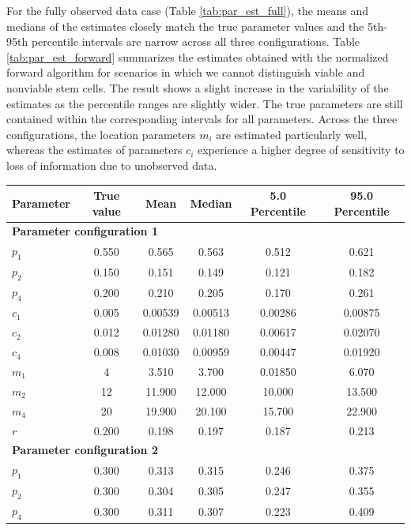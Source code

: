 \documentclass[pdflatex,sn-mathphys-num]{sn-jnl}
\theoremstyle{thmstyleone}%
\theoremstyle{thmstyletwo}%
\theoremstyle{thmstylethree}%
\begin{document}
For the fully observed data case (Table \ref{tab:par_est_full}), the means and medians of the estimates closely match the true parameter values and the 5th-95th percentile intervals are narrow across all three configurations. Table \ref{tab:par_est_forward} summarizes the estimates obtained with the normalized forward algorithm for scenarios in which we cannot distinguish viable and nonviable stem cells. The result shows a slight increase in the variability of the estimates as the percentile ranges are slightly wider. The true parameters are still contained within the corresponding intervals for all parameters. Across the three configurations, the location parameters $m_i$ are estimated particularly well, whereas the estimates of parameters $c_i$ experience a higher degree of sensitivity to loss of information due to unobserved data.
\begin{table}[h]
    \centering
    \begin{tabular}{lccccc}
        \toprule
         Parameter & True value & Mean & Median  & 5.0 Percentile & 95.0 Percentile \\
        \midrule
        \multicolumn{4}{l}{\textbf{Parameter configuration 1}} \\
        $p_1$ & 0.550 & 0.565 & 0.563 &  0.512 & 0.621 \\
        $p_2$ & 0.150 & 0.151 & 0.149 & 0.121 & 0.182 \\
        $p_4$ & 0.200 & 0.210 & 0.205 &  0.170 & 0.261\\
        $c_1$ & 0.005 & 0.00539 & 0.00513 & 0.00286 & 0.00875 \\
        $c_2$ & 0.012 & 0.01280 & 0.01180 & 0.00617 & 0.02070\\
        $c_4$ & 0.008 & 0.01030 & 0.00959 & 0.00447 & 0.01920\\
        $m_1$ & 4 & 3.510 & 3.700 & 0.01850 & 6.070 \\
        $m_2$ & 12 & 11.900 & 12.000 & 10.000 & 13.500 \\
        $m_4$ & 20 & 19.900 & 20.100 & 15.700 & 22.900 \\
        $r$ & 0.200  & 0.198 & 0.197 &  0.187 & 0.213\\
        \multicolumn{4}{l}{\textbf{Parameter configuration 2}} \\
        $p_1$ & 0.300 & 0.313 & 0.315  & 0.246 & 0.375\\
        $p_2$ & 0.300 & 0.304 & 0.305 &
        0.247 & 0.355 \\
        $p_4$ & 0.300 & 0.311  & 0.307  & 0.223 & 0.409\\

\end{tabular}
\end{table}
\end{document}
